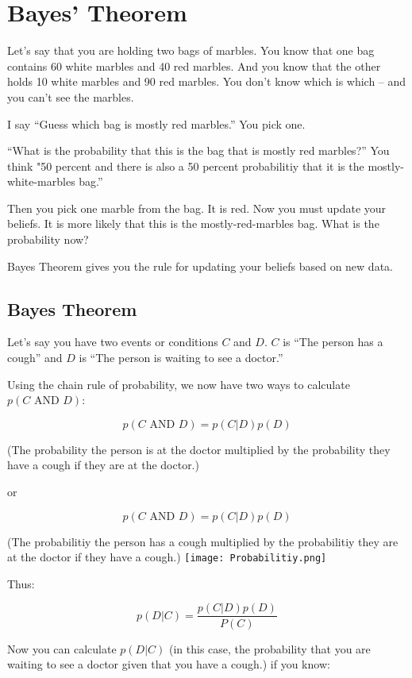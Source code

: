 \chapter{Bayes' Theorem}

Let's say that you are holding two bags of marbles.
You know that one bag contains 60 white marbles and 40 red marbles. And you
know that the other holds 10 white marbles and 90 red marbles. You
don't know which is which -- and you can't see the marbles.

I say ``Guess which bag is mostly red marbles.'' You pick one.

``What is the probability that this is the bag that is mostly red marbles?''
 You think "50 percent and there is
also a 50 percent probabilitiy that it is the mostly-white-marbles bag.''

Then you pick one marble from the bag. It is red. Now you must
update your beliefs. It is more likely that this is the
mostly-red-marbles bag. What is the probability now?

Bayes Theorem gives you the rule for updating your beliefs based on
new data.

\section{Bayes Theorem}

Let's say you have two events or conditions $C$ and $D$. $C$ is
``The person has a cough'' and $D$ is ``The person is waiting to see a doctor.''

Using the chain rule of probability, we now have two ways to calculate $p(C \text{ AND } D)$:

$$p(C \text{ AND } D) = p(C | D) p(D)$$

(The probability the person is at the doctor multiplied by the probability they have a cough if they are at the doctor.)

or 

$$p(C \text{ AND } D) = p(C | D) p(D)$$

(The probabilitiy the person has a cough multiplied by the probabilitiy they are at the doctor if they have a cough.)
\texttt{[image: Probabilitiy.png]}

Thus:

$$p(D | C) = \frac {p(C | D)p(D)}{P(C)}$$

Now you can calculate $p(D | C)$ (in this case, the probability that
you are waiting to see a doctor given that you have a cough.) if you
know:

